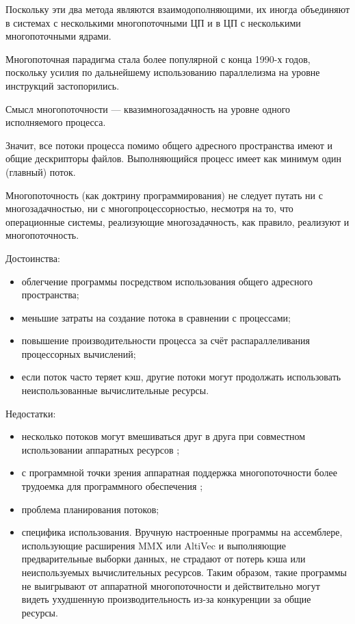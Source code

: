 \documentclass[12pt]{report}
\begin{document}
Поскольку эти два метода являются взаимодополняющими, их иногда объединяют в системах с несколькими многопоточными ЦП и в ЦП с несколькими многопоточными ядрами.


Многопоточная парадигма стала более популярной с конца 1990-х годов, поскольку усилия по дальнейшему использованию параллелизма на уровне инструкций застопорились.

Смысл многопоточности — квазимногозадачность на уровне одного исполняемого процесса.

Значит, все потоки процесса помимо общего адресного пространства имеют и общие дескрипторы файлов. Выполняющийся процесс имеет как минимум один (главный) поток.


Многопоточность (как доктрину программирования) не следует путать ни с многозадачностью, ни с многопроцессорностью, несмотря на то, что операционные системы, реализующие многозадачность, как правило, реализуют и многопоточность.


Достоинства:

\begin{itemize}

	\item облегчение программы посредством использования общего адресного пространства;

	\item меньшие затраты на создание потока в сравнении с процессами;

	\item повышение производительности процесса за счёт распараллеливания процессорных вычислений;

	\item если поток часто теряет кэш, другие потоки могут продолжать использовать неиспользованные вычислительные ресурсы.

\end{itemize}


Недостатки:

\begin{itemize}

	\item несколько потоков могут вмешиваться друг в друга при совместном использовании аппаратных ресурсов \cite{Nemirovsky};

	\item с программной точки зрения аппаратная поддержка многопоточности более трудоемка для программного обеспечения \cite{Olukotun};

	\item проблема планирования потоков;

	\item специфика использования. Вручную настроенные программы на ассемблере, использующие расширения MMX или AltiVec и выполняющие предварительные выборки данных, не страдают от потерь кэша или неиспользуемых вычислительных ресурсов. Таким образом, такие программы не выигрывают от аппаратной многопоточности и действительно могут видеть ухудшенную производительность из-за конкуренции за общие ресурсы.

\end{itemize}
\end{document}
